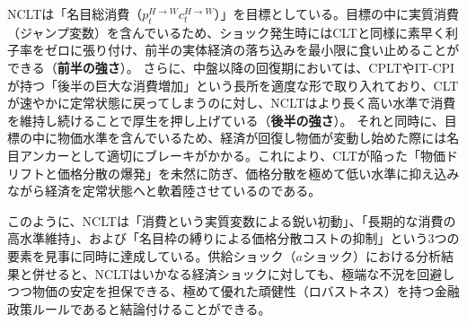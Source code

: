 NCLTは「名目総消費（\(p_t^{H\to W}c_t^{H\to W}\)）」を目標としている。目標の中に実質消費（ジャンプ変数）を含んでいるため、ショック発生時にはCLTと同様に素早く利子率をゼロに張り付け、前半の実体経済の落ち込みを最小限に食い止めることができる（\textbf{前半の強さ}）。
さらに、中盤以降の回復期においては、CPLTやIT-CPIが持つ「後半の巨大な消費増加」という長所を適度な形で取り入れており、CLTが速やかに定常状態に戻ってしまうのに対し、NCLTはより長く高い水準で消費を維持し続けることで厚生を押し上げている（\textbf{後半の強さ}）。
それと同時に、目標の中に物価水準を含んでいるため、経済が回復し物価が変動し始めた際には名目アンカーとして適切にブレーキがかかる。これにより、CLTが陥った「物価ドリフトと価格分散の爆発」を未然に防ぎ、価格分散を極めて低い水準に抑え込みながら経済を定常状態へと軟着陸させているのである。

このように、NCLTは「消費という実質変数による鋭い初動」、「長期的な消費の高水準維持」、および「名目枠の縛りによる価格分散コストの抑制」という3つの要素を見事に同時に達成している。供給ショック（\(a\)ショック）における分析結果と併せると、NCLTはいかなる経済ショックに対しても、極端な不況を回避しつつ物価の安定を担保できる、極めて優れた頑健性（ロバストネス）を持つ金融政策ルールであると結論付けることができる。